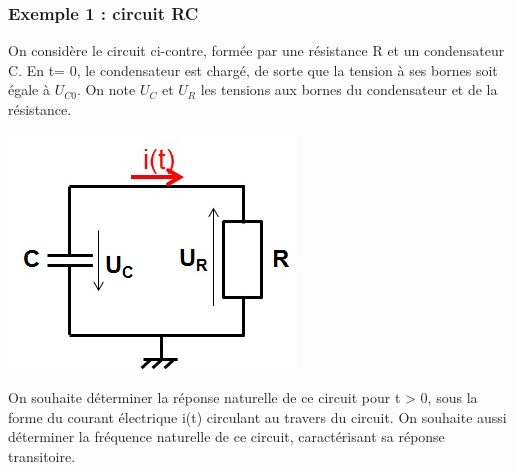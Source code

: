 \documentclass[]{book}
\begin{document}
{	\subsubsection{Exemple 1 : circuit RC}
		
	\begin{minipage}[l]{0.7\linewidth}
		On considère le circuit ci-contre, formée par une résistance R et un condensateur C. En t= 0, le condensateur est chargé, de sorte que la tension à ses bornes soit égale à $U_{C0}$. On note $U_{C}$ et $U_{R}$ les tensions aux bornes du condensateur et de la résistance. 	
	\end{minipage} \hfill
	\begin{minipage}[r]{0.4\linewidth}
		\includegraphics[scale=0.5]{images/circuit_RC_reponse_naturelle.jpg} 	
	\end{minipage}
	\vspace{0.5\baselineskip}
	On souhaite déterminer la réponse naturelle de ce circuit pour t > 0, sous la forme du courant électrique i(t) circulant au travers du circuit. On souhaite aussi déterminer la fréquence naturelle de ce circuit, caractérisant sa réponse transitoire.
	
}
\end{document}
